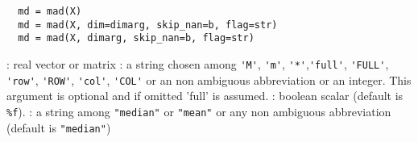 
\begin{mandesc}
\end{mandesc}

\begin{calling_sequence}
\begin{verbatim}
  md = mad(X)
  md = mad(X, dim=dimarg, skip_nan=b, flag=str)  
  md = mad(X, dimarg, skip_nan=b, flag=str)  
\end{verbatim}
\end{calling_sequence}
\begin{parameters}
  \begin{varlist}
    : real vector or matrix
    : a string chosen among \verb+'M'+, \verb+'m'+, \verb+'*'+,\verb+'full'+, \verb+'FULL'+, \verb+'row'+,
    \verb+'ROW'+, \verb+'col'+, \verb+'COL'+ or an non ambiguous abbreviation or an integer. 
    This argument is optional and if omitted 'full' is assumed.
    : boolean scalar (default is \verb+%f+).
    : a string among \verb+"median"+ or \verb+"mean"+ or any non ambiguous abbreviation 
          (default is \verb+"median"+)
  \end{varlist}
\end{parameters}

